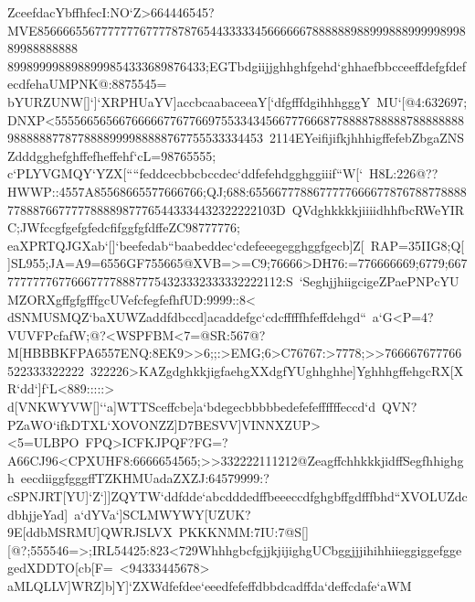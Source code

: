 {{{ ZceefdacYbffhfecI:NO`Z>664446545?MVE856666556777777767777878765443333345666666788888898899988899999899889988888888%
 8998999988988999854333689876433;EGTbdgiijjghhghfgehd`ghhaefbbcceeffdefgfdefecdfehaUMPNK@:8875545=}
 \hbox{bYURZUNW[]`]`XRPHUaYV]accbcaabaceeaY[`dfgfffdgihhhgggY%
 MU`[@4:632697;DNXP<55556656566766666776776697553343456677766687788887888887888888889888888778778888999988888767755533334453%
 2114EYeifijifkjhhhigffefebZbgaZNSZdddgghefghffefheffehf`cL=98765555;}
 \hbox{c`PLYVGMQY`YZX[````feddcecbbcbccdec`ddfefehdgghggiiif``W[`%
 H8L:226@??HWWP::4557A85568665577666766;QJ;688:6556677788677777666677876788778888778887667777788889877765443334432322222103D%
 QVdghkkkkjiiiidhhfbcRWeYIRC;JWfccgfgefgfedcfifggfgfdffeZC98777776;}
 \hbox{eaXPRTQJGXab`[]`beefedab``baabeddec`cdefeeegegghggfgecb]Z[%
 RAP=35IIG8;Q[]SL955;JA=A9=6556GF755665@XVB=>=C9;76666>DH76:=776666669;6779;6677777777677666777788877754323332333332222112:S%
 `SeghjjhiigcigeZPaePNPcYUMZORXgffgfgfffgcUVefcfegfefhfUD:9999::8<}
 \hbox{dSNMUSMQZ`baXUWZaddfdbccd]acaddefgc`cdcfffffhfeffdehgd``%
 a`G<P=4?VUVFPcfafW;@?<WSPFBM<7=@SR:567@?M[HBBBKFPA6557ENQ:8EK9>>6;;:>EMG;6>C76767:>7778;>>766667677766522333322222%
 322226>KAZgdghkkjigfaehgXXdgfYUghhghhe]YghhhgffehgcRX[XR`dd`]f`L<889:::::>}
 \hbox{d[VNKWYVW[]``a]WTTSceffcbe]a`bdegecbbbbbedefefeffffffeccd`d%
 QVN?PZaWO`ifkDTXL`XOVONZZ]D7BESVV]VINNXZUP><5=ULBPO%
 FPQ>ICFKJPQF?FG=?A66CJ96<CPXUHF8:6666654565;>>332222111212@ZeagffchhkkkjidffSegfhhighgh%
 eecdiiggfgggffTZKHMUadaZXZJ:64579999:?}
 \hbox{cSPNJRT[YU]`Z`]]ZQYTW`ddfdde`abcdddedffbeeeccdfghgbffgdfffbhd``XVOLUZdcdbhjjeYad]%
 a`dYVa`]SCLMWYWY[UZUK?9E[ddbMSRMU]QWRJSLVX%
 PKKKNMM:7IU:7@S[][@?;555546=>;IRL54425:823<729WhhhgbcfgjjkjijighgUCbggjjjihihhiieggiggefggegedXDDTO[cb[F=%
 <94333445678>}
 \hbox{aMLQLLV]WRZ]b]Y]`ZXWdfefdee`eeedfefeffdbbdcadffda`deffcdafe`aWM%
}}}
